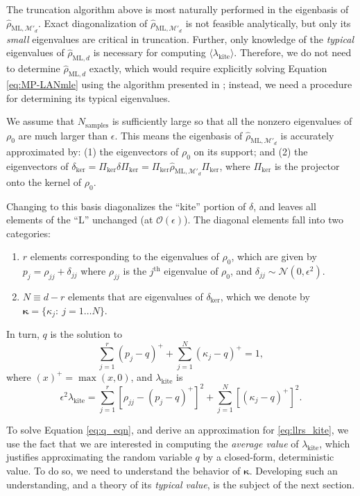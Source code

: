 \documentclass[aps,pra, twocolumn]{revtex4-1}
\newcommand{\M}{\mathcal{M}}
\newcommand{\bvec}[1]{\boldsymbol{#1}}
\newcommand{\rhohat}{\hat{\rho}}
\newcommand{\rhoML}[1]{\rhohat_{\scriptscriptstyle{\mathrm{ML},#1}}}
\begin{document}
The truncation algorithm above is most naturally performed in the eigenbasis of $\rhoML{\M'_{d}}$.  Exact diagonalization of $\rhoML{\M'_{d}}$ is not feasible analytically, but only its \emph{small} eigenvalues are critical in truncation. Further, only knowledge of the \emph{typical} eigenvalues of $\rhoML{d}$ is necessary for computing $\langle \lambda_{\mathrm{kite}}\rangle$. Therefore, we do not need to determine $\rhoML{d}$ exactly, which would require explicitly solving Equation \eqref{eq:MP-LANmle} using the algorithm presented in \cite{Smolin2012}; instead, we need a procedure for determining its typical eigenvalues.

We assume that $N_{\mathrm{samples}}$ is sufficiently large so that all the nonzero eigenvalues of $\rho_0$ are much larger than $\epsilon$. This means the eigenbasis of $\rhoML{\M'_{d}}$ is accurately approximated by: (1) 
the eigenvectors of $\rho_0$ on its support; and (2) the eigenvectors of $\delta_{\mathrm{ker}} = \Pi_{\mathrm{ker}}\delta\Pi_{\mathrm{ker}} = \Pi_{\mathrm{ker}}\rhoML{\M'_{d}}\Pi_{\mathrm{ker}}$, where $\Pi_{\mathrm{ker}}
$ is the projector onto the kernel of $\rho_0$.

Changing to this basis diagonalizes the ``kite'' portion of $\delta$, and leaves all elements of the ``L'' unchanged (at $\mathcal{O}(\epsilon)$).  The diagonal elements fall into two categories:
\begin{enumerate}[noitemsep]
\item $r$ elements corresponding to the eigenvalues of $\rho_0$, which are given by $p_{j} = \rho_{jj} + \delta_{jj}$ where  $\rho_{jj}$ is the $j^{\mathrm{th}}$ eigenvalue of $\rho_{0}$, and $\delta_{jj} \sim \mathcal{N}(0,\epsilon^2)$.
\item $N \equiv d-r$ elements that are eigenvalues of $\delta_{\mathrm{ker}}$, which we denote by $\bvec{\kappa} = \{\kappa_j:~j = 1\ldots 
N\}$.
\end{enumerate}
In turn, $q$ is the solution to
\begin{equation}
\label{eq:q_eqn}
 \sum_{j=1}^{r}(p_j - q)^{+} + \sum_{j=1}^{N}{(\kappa_j-q)^+} = 1,
\end{equation}
where $(x)^{+} = \max(x, 0)$, and $\lambda_{\mathrm{kite}}$ is
\begin{equation}
\label{eq:llrs_kite}
\epsilon^{2}\lambda_{\mathrm{kite}} = \sum_{j=1}^{r}[\rho_{jj}- (p_j-q)^{+}]^2 + \sum_{j=1}^{N}\left[(\kappa_j-q)^+\right]^2.
\end{equation}
 
To solve Equation \eqref{eq:q_eqn}, and derive an approximation for \eqref{eq:llrs_kite}, we use the fact that we are interested in computing the \emph{average value} of $\lambda_{\mathrm{kite}}$, which justifies approximating the random variable $q$ by a closed-form, deterministic value. To do so, we need to understand the behavior of $\bvec{\kappa}$. Developing such an understanding, and a theory of its \emph{typical value}, is the subject of the next section.
\end{document}
